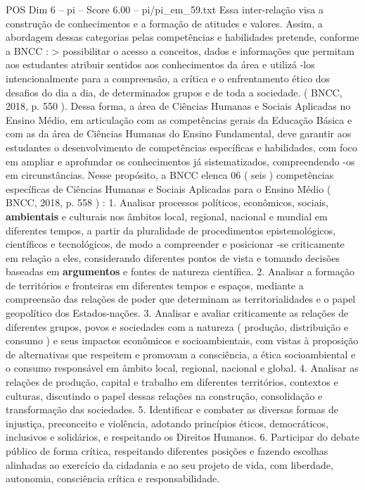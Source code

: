\begin{textsample}{POS Dim 6 – pi – Score 6.00 – pi/pi\_em\_59.txt}
Essa inter-relação visa a construção de conhecimentos e a formação de atitudes e valores.
Assim, a abordagem dessas categorias pelas competências e habilidades pretende, conforme a BNCC : > possibilitar o acesso a conceitos, dados e informações que permitam aos estudantes atribuir sentidos aos conhecimentos da área e utilizá -los intencionalmente para a compreensão, a crítica e o enfrentamento ético dos desafios do dia a dia, de determinados grupos e de toda a sociedade. ( BNCC, 2018, p. 550 ).
Dessa forma, a área de Ciências Humanas e Sociais Aplicadas no Ensino Médio, em articulação com as competências gerais da Educação Básica e com as da área de Ciências Humanas do Ensino Fundamental, deve garantir aos estudantes o desenvolvimento de competências específicas e habilidades, com foco em ampliar e aprofundar os conhecimentos já sistematizados, compreendendo -os em circunstâncias.
Nesse propósito, a BNCC elenca 06 ( seis ) competências específicas de Ciências Humanas e Sociais Aplicadas para o Ensino Médio ( BNCC, 2018, p. 558 ) : 1.
Analisar processos políticos, econômicos, sociais, \textbf{ambientais} e culturais nos âmbitos local, regional, nacional e mundial em diferentes tempos, a partir da pluralidade de procedimentos epistemológicos, científicos e tecnológicos, de modo a compreender e posicionar -se criticamente em relação a eles, considerando diferentes pontos de vista e tomando decisões baseadas em \textbf{argumentos} e fontes de natureza científica. 2.
Analisar a formação de territórios e fronteiras em diferentes tempos e espaços, mediante a compreensão das relações de poder que determinam as territorialidades e o papel geopolítico dos Estados-nações. 3.
Analisar e avaliar criticamente as relações de diferentes grupos, povos e sociedades com a natureza ( produção, distribuição e consumo ) e seus impactos econômicos e socioambientais, com vistas à proposição de alternativas que respeitem e promovam a consciência, a ética socioambiental e o consumo responsável em âmbito local, regional, nacional e global. 4.
Analisar as relações de produção, capital e trabalho em diferentes territórios, contextos e culturas, discutindo o papel dessas relações na construção, consolidação e transformação das sociedades. 5.
Identificar e combater as diversas formas de injustiça, preconceito e violência, adotando princípios éticos, democráticos, inclusivos e solidários, e respeitando os Direitos Humanos. 6.
Participar do debate público de forma crítica, respeitando diferentes posições e fazendo escolhas alinhadas ao exercício da cidadania e ao seu projeto de vida, com liberdade, autonomia, consciência crítica e responsabilidade.

\end{textsample}
